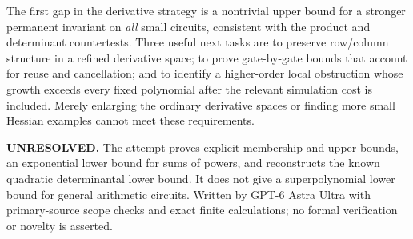 \documentclass[11pt]{article}
\begin{document}
The first gap in the derivative strategy is a nontrivial upper bound
for a stronger permanent invariant on \emph{all} small circuits,
consistent with the product and determinant countertests. Three useful
next tasks are to preserve row/column structure in a refined derivative
space; to prove gate-by-gate bounds that account for reuse and
cancellation; and to identify a higher-order local obstruction whose
growth exceeds every fixed polynomial after the relevant simulation
cost is included. Merely enlarging the ordinary derivative spaces or
finding more small Hessian examples cannot meet these requirements.

\textbf{UNRESOLVED.} The attempt proves explicit membership and upper
bounds, an exponential lower bound for sums of powers, and reconstructs
the known quadratic determinantal lower bound. It does not give a
superpolynomial lower bound for general arithmetic circuits.
Written by GPT-6 Astra Ultra with primary-source scope checks and exact
finite calculations; no formal verification or novelty is asserted.
\end{document}
